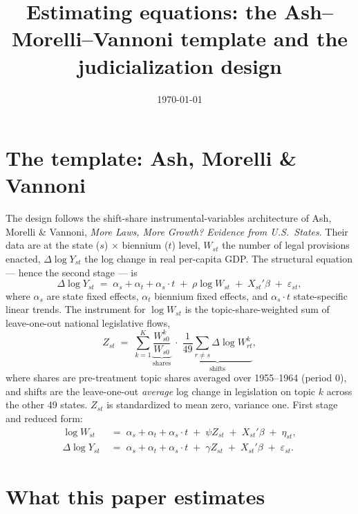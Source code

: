 \documentclass[10pt]{article}
\title{\vspace{-2.2em}\large\bfseries Estimating equations: the Ash--Morelli--Vannoni
template and the judicialization design}
\author{}
\date{\vspace{-2.5em}\small \today\vspace{-1em}}
\begin{document}
\maketitle

\section{The template: Ash, Morelli \& Vannoni}

The design follows the shift-share instrumental-variables architecture of Ash, Morelli
\& Vannoni, \emph{More Laws, More Growth? Evidence from U.S.\ States}. Their data are at the
state ($s$) $\times$ biennium ($t$) level, $W_{st}$ the number of legal provisions
enacted, $\Delta \log Y_{st}$ the log change in real per-capita GDP. The structural
equation --- hence the second stage --- is
%
\begin{equation}
\Delta \log Y_{st} \;=\; \alpha_s + \alpha_t + \alpha_s \cdot t
  \;+\; \rho \log W_{st} \;+\; X_{st}'\beta \;+\; \varepsilon_{st},
\end{equation}
%
where $\alpha_s$ are state fixed effects, $\alpha_t$ biennium fixed effects, and
$\alpha_s \cdot t$ state-specific linear trends. The instrument for $\log W_{st}$ is the
topic-share-weighted sum of leave-one-out national legislative flows,
%
\begin{equation}
Z_{st} \;=\; \sum_{k=1}^{K}
  \underbrace{\frac{W^{k}_{s0}}{W_{s0}}}_{\text{shares}} \;\cdot\;
  \underbrace{\frac{1}{49}\sum_{r \neq s} \Delta \log W^{k}_{rt}}_{\text{shifts}} ,
\end{equation}
%
where shares are pre-treatment topic shares averaged over 1955--1964 (period $0$), and
shifts are the leave-one-out \emph{average} log change in legislation on topic $k$ across
the other 49 states. $Z_{st}$ is standardized to mean zero, variance one. First stage and
reduced form:
%
\begin{align}
\log W_{st} &\;=\; \alpha_s + \alpha_t + \alpha_s \cdot t
  \;+\; \psi Z_{st} \;+\; X_{st}'\beta \;+\; \eta_{st}, \\[-1pt]
\Delta \log Y_{st} &\;=\; \alpha_s + \alpha_t + \alpha_s \cdot t
  \;+\; \gamma Z_{st} \;+\; X_{st}'\beta \;+\; \varepsilon_{st}.
\end{align}

\section{What this paper estimates}
\end{document}
